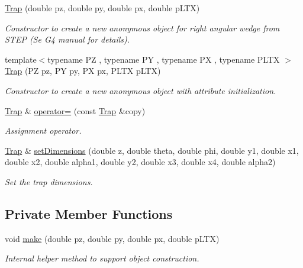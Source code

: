 \begin{DoxyCompactItemize}
\hyperlink{class_d_d4hep_1_1_geometry_1_1_trap_aaefea9c824b382d67d0b5d6b3fe3f62d}{Trap} (double pz, double py, double px, double pLTX)
\begin{DoxyCompactList}\small\item\em Constructor to create a new anonymous object for right angular wedge from STEP (Se G4 manual for details). \item\end{DoxyCompactList}\item 
{\footnotesize template$<$typename PZ , typename PY , typename PX , typename PLTX $>$ }\\\hyperlink{class_d_d4hep_1_1_geometry_1_1_trap_a6f5daa770e696990488a37cd5c85008c}{Trap} (PZ pz, PY py, PX px, PLTX pLTX)
\begin{DoxyCompactList}\small\item\em Constructor to create a new anonymous object with attribute initialization. \item\end{DoxyCompactList}\item 
\hyperlink{class_d_d4hep_1_1_geometry_1_1_trap}{Trap} \& \hyperlink{class_d_d4hep_1_1_geometry_1_1_trap_ab77ba113f9b9a64755f8c4f20c076e70}{operator=} (const \hyperlink{class_d_d4hep_1_1_geometry_1_1_trap}{Trap} \&copy)
\begin{DoxyCompactList}\small\item\em Assignment operator. \item\end{DoxyCompactList}\item 
\hyperlink{class_d_d4hep_1_1_geometry_1_1_trap}{Trap} \& \hyperlink{class_d_d4hep_1_1_geometry_1_1_trap_a577c150f75380ee4b93ec1c339066561}{setDimensions} (double z, double theta, double phi, double y1, double x1, double x2, double alpha1, double y2, double x3, double x4, double alpha2)
\begin{DoxyCompactList}\small\item\em Set the trap dimensions. \item\end{DoxyCompactList}\end{DoxyCompactItemize}
\subsection*{Private Member Functions}
\begin{DoxyCompactItemize}
\item 
void \hyperlink{class_d_d4hep_1_1_geometry_1_1_trap_a2dcf7eee64e3128d22a35d1b1f872cf9}{make} (double pz, double py, double px, double pLTX)
\begin{DoxyCompactList}\small\item\em Internal helper method to support object construction. \item\end{DoxyCompactList}\end{DoxyCompactItemize}


